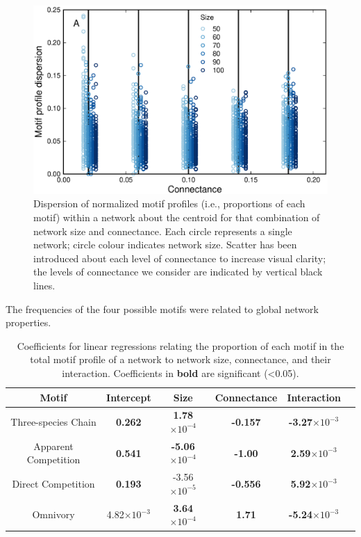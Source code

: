 \documentclass[12pt]{article}
\begin{document}
\begin{spacing}{2.0}
   \begin{figure}[hb!]
       \centering
       \includegraphics[width=.75\textwidth]{figures/proportion_profile_dispersion.eps}
       \caption{Dispersion of normalized motif profiles (i.e., proportions of each motif) within a network about the centroid for that combination of network size and connectance. Each circle represents a single network; circle colour indicates network size. Scatter has been introduced about each level of connectance to increase visual clarity; the levels of connectance we consider are indicated by vertical black lines.}
       \label{dispersion_normmotifs}
    \end{figure}


    The frequencies of the four possible motifs were related to global network properties.

    \begin{table}[hb!]
        \centering
        \caption{Coefficients for linear regressions relating the proportion of each motif in the total motif profile of a network to network size, connectance, and their interaction. Coefficients in \textbf{bold} are significant (\textless0.05).}
       \label{network_prop_lms}
       \begin{tabular}{c|c c c c c}
            Motif & Intercept & Size & Connectance & Interaction \\
            \hline
            Three-species Chain & \textbf{0.262} & \textbf{1.78$\times10^{-4}$} & \textbf{-0.157} & \textbf{-3.27$\times10^{-3}$} \\
            Apparent Competition & \textbf{0.541} & \textbf{-5.06$\times10^{-4}$} & \textbf{-1.00} & \textbf{2.59$\times10^{-3}$} \\
            Direct Competition & \textbf{0.193} & -3.56$\times10^{-5}$ & \textbf{-0.556} & \textbf{5.92$\times10^{-3}$} \\
            Omnivory & 4.82$\times10^{-3}$ & \textbf{3.64$\times10^{-4}$} & \textbf{1.71} & \textbf{-5.24$\times10^{-3}$}\\
            \hline
            \end{tabular}
    \end{table}        
\clearpage
    

\end{spacing}
\end{document}
